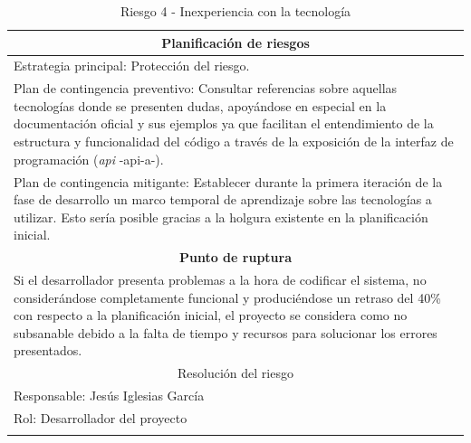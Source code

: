 \documentclass[12pt,a4paper, twoside]{report}
\begin{document}
\begin{longtable}{m{4cm}|m{5cm}|m{4cm}}
		\multicolumn{3}{|c|}{\textbf{Planificación de riesgos}} \\ \hline \hline
		\multicolumn{3}{|p{17cm}|}{Estrategia principal: Protección del riesgo.} \\ \hline
		\multicolumn{3}{|p{17cm}|}{Plan de contingencia preventivo: Consultar referencias sobre aquellas tecnologías donde se presenten dudas, apoyándose en especial en la documentación oficial y sus ejemplos ya que facilitan el entendimiento de la estructura y funcionalidad del código a través de la exposición de la interfaz de programación (\textit{\gls{api}} -\gls{api-a}-).} \\ \hline
		\multicolumn{3}{|p{17cm}|}{Plan de contingencia mitigante: Establecer durante la primera iteración de la fase de desarrollo un marco temporal de aprendizaje sobre las tecnologías a utilizar. Esto sería posible gracias a la holgura existente en la planificación inicial.} \\ \hline
			
		\multicolumn{3}{|c|}{\textbf{Punto de ruptura}} \\ \hline \hline
		\multicolumn{3}{|p{17cm}|}{Si el desarrollador presenta problemas a la hora de codificar el sistema, no considerándose completamente funcional y produciéndose un retraso del 40\% con respecto a la planificación inicial, el proyecto se considera como no subsanable debido a la falta de tiempo y recursos para solucionar los errores presentados.}\\ \hline
			
		\multicolumn{3}{|c|}{Resolución del riesgo} \\ \hline \hline
		\multicolumn{3}{|p{17cm}|}{Responsable: Jesús Iglesias García}\\ \hline
		\multicolumn{3}{|p{17cm}|}{Rol: Desarrollador del proyecto} \\ \hline
		\caption{Riesgo 4 - Inexperiencia con la tecnología}
	\end{longtable}	
			
\end{document}
